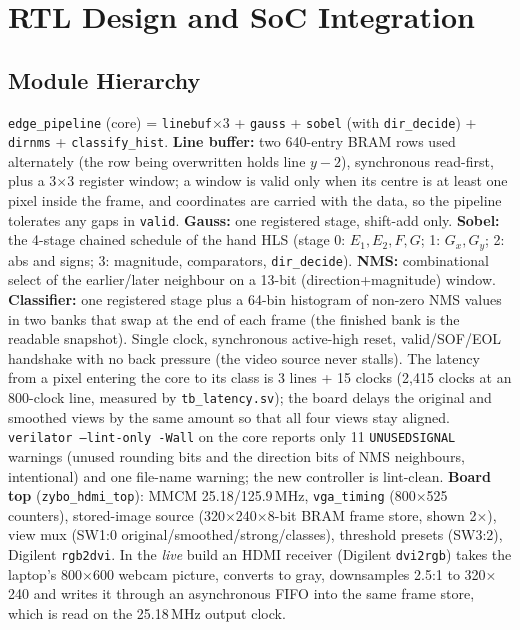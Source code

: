 \documentclass[11pt,a4paper]{article}
\begin{document}
\section{RTL Design and SoC Integration}
\label{sec:rtl}
\subsection{Module Hierarchy}
\texttt{edge\_pipeline} (core) = \texttt{linebuf}$\times$3 + \texttt{gauss} + \texttt{sobel} (with \texttt{dir\_decide}) +
\texttt{dirnms} + \texttt{classify\_hist}. \textbf{Line buffer:} two 640-entry BRAM rows used alternately (the row being
overwritten holds line $y-2$), synchronous read-first, plus a 3$\times$3 register window; a window is valid only when its centre is
at least one pixel inside the frame, and coordinates are carried with the data, so the pipeline tolerates any gaps in
\texttt{valid}. \textbf{Gauss:} one registered stage, shift-add only. \textbf{Sobel:} the 4-stage chained schedule of the hand HLS
(stage 0: $E_1,E_2,F,G$; 1: $G_x,G_y$; 2: abs and signs; 3: magnitude, comparators, \texttt{dir\_decide}). \textbf{NMS:}
combinational select of the earlier/later neighbour on a 13-bit (direction+magnitude) window. \textbf{Classifier:} one
registered stage plus a 64-bin histogram of non-zero NMS values in two banks that swap at the end of each frame (the
finished bank is the readable snapshot). Single clock, synchronous active-high reset, valid/SOF/EOL handshake with no back
pressure (the video source never stalls). The latency from a pixel entering the core to its class is 3 lines + 15 clocks
(2{,}415 clocks at an 800-clock line, measured by \texttt{tb\_latency.sv}); the board delays the original and smoothed views by
the same amount so that all four views stay aligned. \texttt{verilator --lint-only -Wall} on the core reports only 11
\texttt{UNUSEDSIGNAL} warnings (unused rounding bits and the direction bits of NMS neighbours, intentional) and one file-name
warning; the new controller is lint-clean.
\textbf{Board top} (\texttt{zybo\_hdmi\_top}): MMCM 25.18/125.9\,MHz, \texttt{vga\_timing} (800$\times$525 counters), stored-image
source (320$\times$240$\times$8-bit BRAM frame store, shown 2$\times$), view mux (SW1:0 original/smoothed/strong/classes), threshold
presets (SW3:2), Digilent \texttt{rgb2dvi}. In the \emph{live} build an HDMI receiver (Digilent \texttt{dvi2rgb}) takes the laptop's
800$\times$600 webcam picture, converts to gray, downsamples 2.5:1 to 320$\times$240 and writes it through an asynchronous FIFO
into the same frame store, which is read on the 25.18\,MHz output clock.
\end{document}
